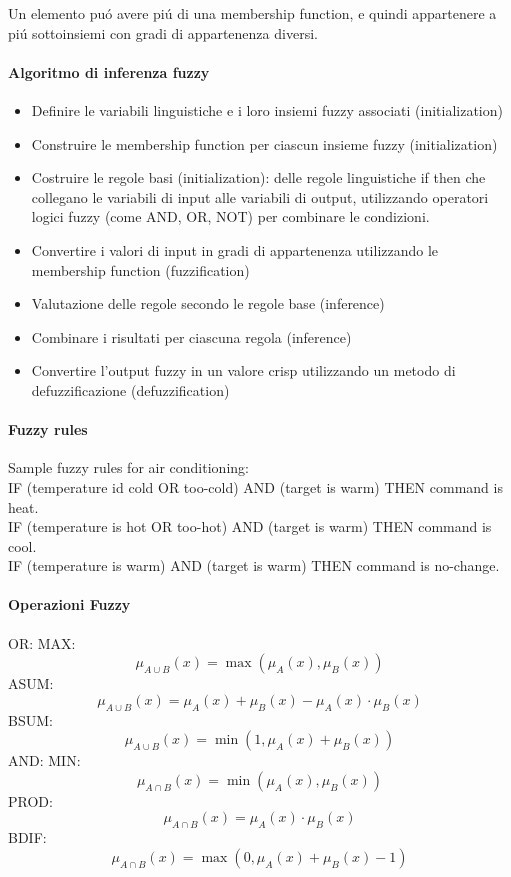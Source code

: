 Un elemento puó avere piú di una membership function, e quindi appartenere a piú sottoinsiemi con gradi di appartenenza diversi.\\

\paragraph{Algoritmo di inferenza fuzzy}
\begin{itemize}
    \item Definire le variabili linguistiche e i loro insiemi fuzzy associati (initialization)
    \item Construire le membership function per ciascun insieme fuzzy (initialization)
    \item Costruire le regole basi (initialization): delle regole linguistiche if then che collegano le 
    variabili di input alle variabili di output, utilizzando operatori logici fuzzy (come AND, OR, NOT) per combinare le condizioni.
    \item Convertire i valori di input in gradi di appartenenza utilizzando le membership function (fuzzification)
    \item Valutazione delle regole secondo le regole base (inference)
    \item Combinare i risultati per ciascuna regola (inference)
    \item Convertire l'output fuzzy in un valore crisp utilizzando un metodo di defuzzificazione (defuzzification)
\end{itemize}

\paragraph{Fuzzy rules}
Sample fuzzy rules for air conditioning:\\
IF (temperature id cold OR too-cold) AND (target is warm) THEN command is heat.\\
IF (temperature is hot OR too-hot) AND (target is warm) THEN command is cool.\\
IF (temperature is warm) AND (target is warm) THEN command is no-change.\\
\paragraph{Operazioni Fuzzy}
OR:
MAX: $$\mu_{A \cup B}(x) = \max(\mu_A(x), \mu_B(x))$$
ASUM: $$\mu_{A \cup B}(x) = \mu_A(x) + \mu_B(x) - \mu_A(x) \cdot \mu_B(x)$$
BSUM: $$\mu_{A \cup B}(x) = \min(1, \mu_A(x) + \mu_B(x))$$
AND:
MIN: $$\mu_{A \cap B}(x) = \min(\mu_A(x), \mu_B(x))$$
PROD: $$\mu_{A \cap B}(x) = \mu_A(x) \cdot \mu_B(x)$$
BDIF: $$\mu_{A \cap B}(x) = \max(0, \mu_A(x) + \mu_B(x) - 1)$$

